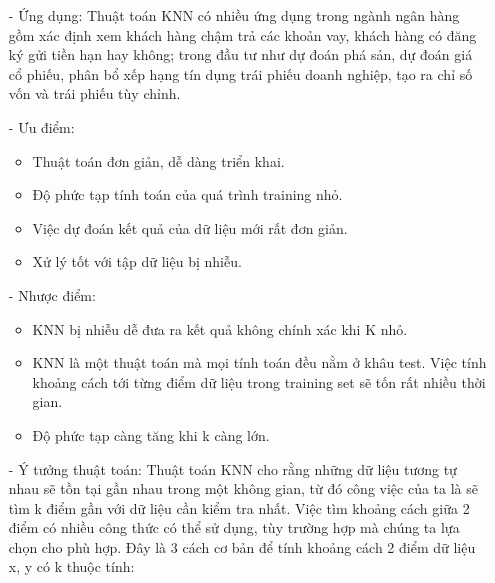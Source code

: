\documentclass{report}
\begin{document}
    \begin{enumerate}
                \item[- ] Ứng dụng:  Thuật toán KNN có nhiều ứng dụng trong ngành ngân hàng gồm xác định xem khách hàng chậm trả các khoản vay, khách hàng có đăng ký gửi tiền hạn hay không; trong đầu tư như dự đoán phá sản, dự đoán giá cổ phiếu, phân bổ xếp hạng tín dụng trái phiếu doanh nghiệp, tạo ra chỉ số vốn và trái phiếu tùy chỉnh.
                \item [- ] Ưu điểm:
                    \begin{itemize}
                        \item Thuật toán đơn giản, dễ dàng triển khai.
                        \item Độ phức tạp tính toán của quá trình training nhỏ.
                        \item Việc dự đoán kết quả của dữ liệu mới rất đơn giản.
                        \item Xử lý tốt với tập dữ liệu bị nhiễu.
                    \end{itemize}
                \item [- ] Nhược điểm:
                    \begin{itemize}
                        \item KNN bị nhiễu dễ đưa ra kết quả không chính xác khi K nhỏ.
                        \item KNN là một thuật toán mà mọi tính toán đều nằm ở khâu test. Việc tính khoảng cách tới từng điểm dữ liệu trong training set sẽ tốn rất nhiều thời gian.
                        \item Độ phức tạp càng tăng khi k càng lớn.
                    \end{itemize}
                \item [- ] Ý tưởng thuật toán:
        Thuật toán KNN cho rằng những dữ liệu tương tự nhau sẽ tồn tại gần nhau trong một không gian, từ đó công việc của ta là sẽ tìm k điểm gần với dữ liệu cần kiểm tra nhất. Việc tìm khoảng cách giữa 2 điểm có nhiều công thức có thể sử dụng, tùy trường hợp mà chúng ta lựa chọn cho phù hợp. Đây là 3 cách cơ bản để tính khoảng cách 2 điểm dữ liệu x, y có k thuộc tính:
            \end{enumerate}
\end{document}
